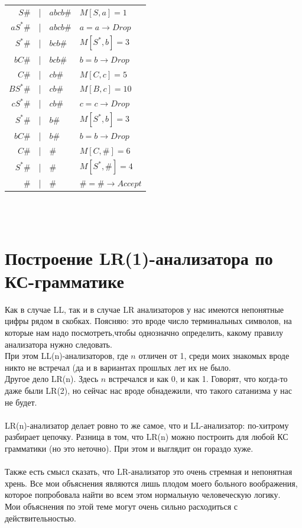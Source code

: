 \documentclass[14pt]{extreport}
\begin{document}
	\begin{tabular}{rcll}
		$S\#$ & | & $abcb\#$ & $M[S,a]=1$\\
		$aS^*\#$ & | & $abcb\#$ & $a=a \to Drop$\\
		$S^*\#$ & | & $bcb\#$ & $M[S^*,b]=3$\\
		$bC\#$ & | & $bcb\#$ & $b=b \to Drop$\\
		$C\#$ & | & $cb\#$ & $M[C, c]=5$\\
		$BS^*\#$ & | & $cb\#$ & $M[B, c]=10$\\
		$cS^*\#$ & | & $cb\#$ & $c=c \to Drop$\\
		$S^*\#$ & | & $b\#$ & $M[S^*,b]=3$\\
		$bC\#$ & | & $b\#$ & $b=b \to Drop$\\
		$C\#$ & | & $\#$ & $M[C, \#]=6$\\
		$S^*\#$ & | & $\#$ & $M[S^*, \#]=4$\\
		$\#$ & | & $\#$ & $\#=\# \to Accept$\\
	\end{tabular}\\\\
	
	
	\chapter{Построение LR(1)-анализатора по КС-грамматике}
	Как в случае LL, так и в случае LR анализаторов у нас имеются непонятные цифры
	рядом в скобках. Поясняю: это вроде число терминальных символов, на которые нам 
	надо посмотреть,чтобы однозначно определить, какому правилу анализатора нужно
	следовать.\\
	При этом LL(n)-анализаторов, где $n$ отличен от 1, среди моих знакомых вроде никто
	не встречал (да и в вариантах прошлых лет их не было.\\
	Другое дело LR(n). Здесь $n$ встречался и как 0, и как 1. Говорят, что когда-то даже
	были LR(2), но сейчас нас вроде обнадежили, что такого сатанизма у нас не будет.\\\\
	LR(n)-анализатор делает ровно то же самое, что и LL-анализатор: по-хитрому разбирает
	цепочку. Разница в том, что LR(n) можно построить для любой КС грамматики (но это
	неточно). При этом и выглядит он гораздо хуже.\\\\
	Также есть смысл сказать, что LR-анализатор это очень стремная и непонятная хрень.
	Все мои объяснения являются лишь плодом моего больного воображения, которое попробовала
	найти во всем этом нормальную человеческую логику.\\
	Мои объяснения по этой теме могут очень сильно расходиться с действительностью.
\end{document}
